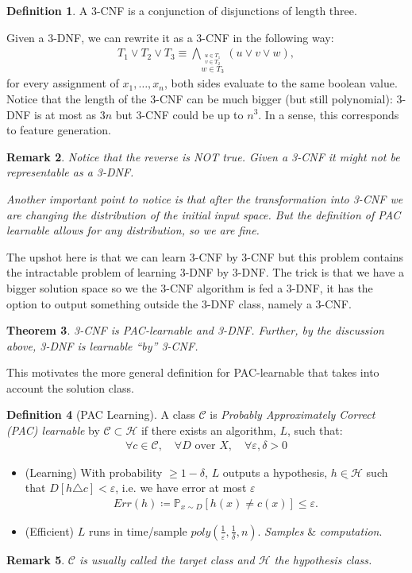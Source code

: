\documentclass[12pt, letterpaper]{article}
\numberwithin{equation}{section} %
\newcommand{\ul}{\underline}
\newcommand{\mb}{\mathbb}
\newcommand{\mc}{\mathcal}
\newcommand{\ve}{\varepsilon}
\newtheorem{theorem}{Theorem}[section]
\newtheorem{remark}[theorem]{Remark}
\theoremstyle{definition}
\newtheorem{definition}[theorem]{Definition}
\theoremstyle{remark}
\begin{document}
\begin{definition}
    A 3-CNF is a conjunction of disjunctions of length three.
\end{definition}

Given a 3-DNF, we can rewrite it as a 3-CNF in the following way:
\begin{align}
    T_1 \lor T_2 \lor T_3 \equiv \bigwedge\limits_{\stackrel{u\in T_1}{\stackrel{v\in T_2}{w\in T_3}}} \left(u \lor v \lor w\right),
\end{align}
for every assignment of $x_1,\ldots,x_n$, both sides evaluate to the same boolean value. Notice that the length of the 3-CNF can be much bigger (but still polynomial): 3-DNF is at most as $3n$ but 3-CNF could be up to $n^3$. In a sense, this corresponds to feature generation.
\begin{remark}
    Notice that the reverse is NOT true. Given a 3-CNF it might not be representable as a 3-DNF. 
    
    Another important point to notice is that after the transformation into 3-CNF we are changing the distribution of the initial input space. But the definition of PAC learnable allows for \emph{any} distribution, so we are fine.
\end{remark}

The upshot here is that we can learn 3-CNF by 3-CNF but this problem contains the intractable problem of learning 3-DNF by 3-DNF. The trick is that we have a bigger solution space so we the 3-CNF algorithm is fed a 3-DNF, it has the option to output something outside the 3-DNF class, namely a 3-CNF.

\begin{theorem}
    3-CNF is PAC-learnable and 3-DNF. Further, by the discussion above, 3-DNF is learnable ``by'' 3-CNF.
\end{theorem}

This motivates the more general definition for PAC-learnable that takes into account the solution class.
\begin{definition}[PAC Learning]
	A class $\mc C$ is \emph{Probably Approximately Correct (PAC) learnable} by $\mc C \subset \mc H$ if there exists an algorithm, $L$, such that:
	\begin{align}
    	\forall c \in \mc C,\quad \forall D \textrm{ over }X,\quad \forall \ve,\delta > 0
	\end{align} 
	\begin{itemize}
		\item (Learning) With probability $\geq 1 -\delta$, $L$ outputs a hypothesis, $\ul{h\in\mc H}$ 
		 such that $D[h\triangle c]<\ve$, i.e. we have error at most $\ve$
		\begin{align}
    		Err(h) \coloneqq \mb P_{x\sim D}[h(x) \ne c(x)] \leq \ve.
		\end{align}
		\item (Efficient) $L$ runs in time/sample $poly\left(\frac1\ve, \frac1\delta, n\right)$. \emph{Samples} \& \emph{computation}.
	\end{itemize}
\end{definition}
\begin{remark}
     $\mc C$ is usually called the target class and $\mc H$ the hypothesis class.
\end{remark}
\end{document}
